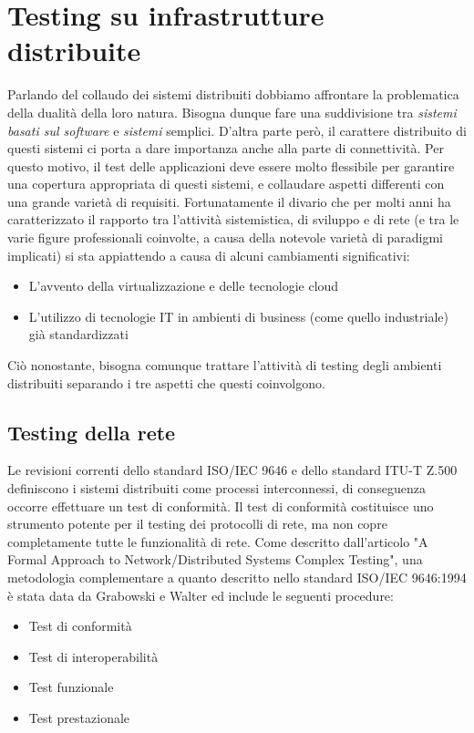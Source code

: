 \section{Testing su infrastrutture distribuite}
Parlando del collaudo dei sistemi distribuiti dobbiamo affrontare la problematica della dualità della loro natura. Bisogna dunque fare una suddivisione tra \textit{sistemi basati sul software} e \textit{sistemi} semplici.\cite{disttest}
D'altra parte però, il carattere distribuito di questi sistemi ci porta a dare importanza anche alla parte di connettività. Per questo motivo, il test delle applicazioni deve essere molto flessibile per garantire una copertura appropriata di questi sistemi, e collaudare aspetti differenti con una grande varietà di requisiti\cite{disttestDelGado}.
Fortunatamente il divario che per molti anni ha caratterizzato il rapporto tra l'attività sistemistica, di sviluppo e di rete (e tra le varie figure professionali coinvolte, a causa della notevole varietà di paradigmi implicati) si sta appiattendo a causa di alcuni cambiamenti significativi:
\begin{itemize}
\item L'avvento della virtualizzazione e delle tecnologie cloud
\item L'utilizzo di tecnologie IT in ambienti di business (come quello industriale) già standardizzati
\end{itemize}
Ciò nonostante, bisogna comunque trattare l'attività di testing degli ambienti distribuiti separando i tre aspetti che questi coinvolgono.\cite{disttest}
\subsection{Testing della rete}
Le revisioni correnti dello standard ISO/IEC 9646\cite{iso9646} e dello standard ITU-T Z.500\cite{itutz500} definiscono i sistemi distribuiti come processi interconnessi, di conseguenza occorre effettuare un test di conformità. Il test di conformità costituisce uno strumento potente per il testing dei protocolli di rete, ma non copre completamente tutte le funzionalità di rete.\cite{tretmans}
Come descritto dall'articolo "A Formal Approach to Network/Distributed Systems Complex Testing"\cite{disttest}, una metodologia complementare a quanto descritto nello standard ISO/IEC 9646:1994 è stata data da Grabowski e Walter \cite{disttestWalterGrabowski1} \cite{disttestWalterGrabowski2} ed include le seguenti procedure:
\begin{itemize}
\item Test di conformità
\item Test di interoperabilità
\item Test funzionale
\item Test prestazionale
\end{itemize}
